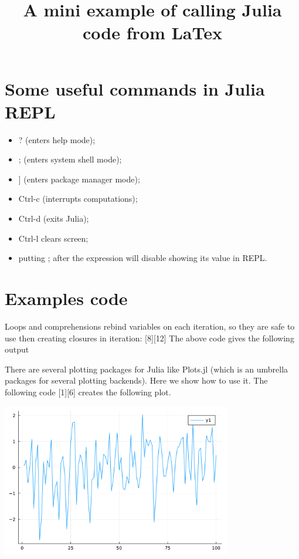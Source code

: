 \documentclass[11pt]{article}
\title{A mini example of calling Julia code from LaTex}
\begin{document}
\maketitle
\section{Some useful commands in Julia REPL}

\begin{itemize}
\item ? (enters help mode);
\item ; (enters system shell mode);
\item ] (enters package manager mode);
\item Ctrl-c (interrupts computations);
\item Ctrl-d (exits Julia);
\item Ctrl-l clears screen;
\item putting ; after the expression will disable showing its value in REPL.
\end{itemize}
\section{Examples code}

Loops and comprehensions rebind variables on each iteration, so they are 
safe to use then creating closures in iteration:
[8][12]
The above code gives the following output

There are several plotting packages for Julia like Plots.jl (which is
an umbrella packages for several plotting backends). Here we show how to use it.
The following code
[1][6]
creates the following plot.
\begin{center}
  \includegraphics[width=0.75\textwidth]{./tmp/randomplot.pdf}
\end{center}
\end{document}
